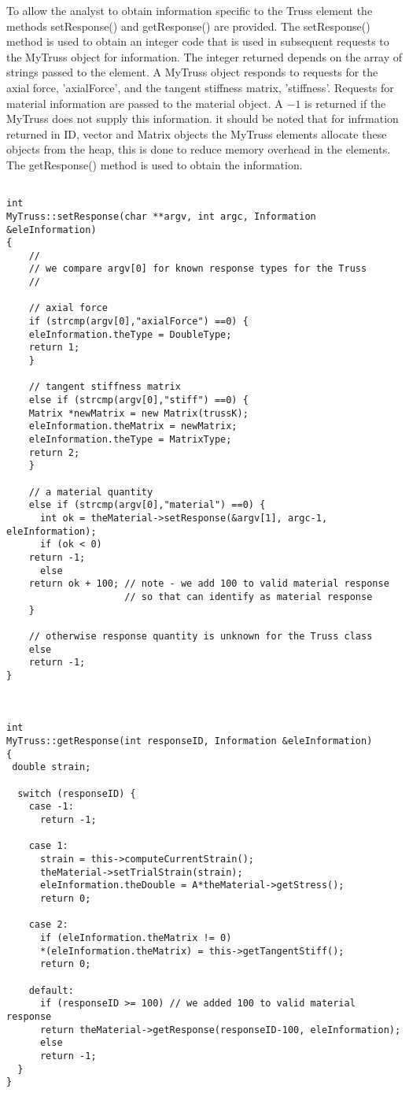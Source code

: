 \documentclass[12pt]{article}
\begin{document}
To allow the analyst to obtain information specific to the Truss
element the methods {\sf setResponse()} and {\sf getResponse()} are
provided. The {\sf setResponse()} method is used to obtain an integer
code that is used in subsequent requests to the MyTruss object for
information. The integer returned depends on the array of strings
passed to the element. A MyTruss object responds to requests for
the axial force, 'axialForce', and the tangent stiffness matrix,
'stiffness'. Requests for material information are passed to the
material object. A $-1$ is returned if the MyTruss does not supply
this information. it should be noted that for infrmation returned in
ID, vector and Matrix objects the MyTruss elements allocate these
objects from the heap, this is done to reduce memory overhead in the
elements. The {\sf getResponse()} method is used to obtain the
information. 

{\sf\small
\begin{verbatim}

int 
MyTruss::setResponse(char **argv, int argc, Information &eleInformation)
{
    //
    // we compare argv[0] for known response types for the Truss
    //

    // axial force
    if (strcmp(argv[0],"axialForce") ==0) {
	eleInformation.theType = DoubleType;
	return 1;
    } 

    // tangent stiffness matrix
    else if (strcmp(argv[0],"stiff") ==0) {
	Matrix *newMatrix = new Matrix(trussK);
	eleInformation.theMatrix = newMatrix;
	eleInformation.theType = MatrixType;
	return 2;
    } 

    // a material quantity    
    else if (strcmp(argv[0],"material") ==0) {
      int ok = theMaterial->setResponse(&argv[1], argc-1, eleInformation);
      if (ok < 0)
	return -1;
      else
	return ok + 100; // note - we add 100 to valid material response 
	                 // so that can identify as material response
    } 
    
    // otherwise response quantity is unknown for the Truss class
    else
	return -1;
}



int 
MyTruss::getResponse(int responseID, Information &eleInformation)
{
 double strain;
 
  switch (responseID) {
    case -1:
      return -1;
      
    case 1:
      strain = this->computeCurrentStrain();
      theMaterial->setTrialStrain(strain);
      eleInformation.theDouble = A*theMaterial->getStress();    
      return 0;
      
    case 2:
      if (eleInformation.theMatrix != 0)
	  *(eleInformation.theMatrix) = this->getTangentStiff();
      return 0;      

    default:
      if (responseID >= 100) // we added 100 to valid material response
	  return theMaterial->getResponse(responseID-100, eleInformation);
      else
	  return -1;
  }
}


\end{verbatim} }
\end{document}
